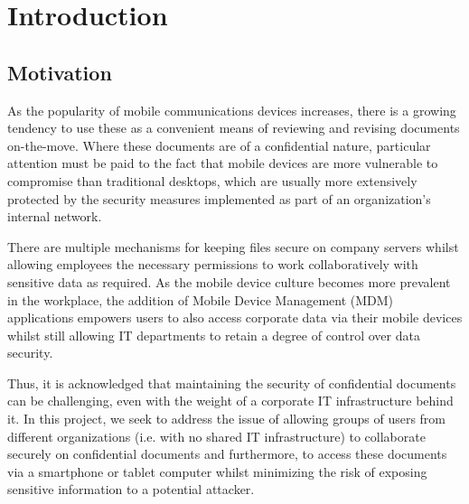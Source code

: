 
\chapter{Introduction}
\label{cha:introduction}
\section{Motivation}
\label{sec:motivation}
As the popularity of mobile communications devices increases, there is a growing tendency to use these as a convenient means of reviewing and revising documents on-the-move. Where these documents are of a confidential nature, particular attention must be paid to the fact that mobile devices are more vulnerable to compromise than traditional desktops, which are usually more extensively protected by the security measures implemented as part of an organization's internal network. 

There are multiple mechanisms for keeping files secure on company servers whilst allowing employees the necessary permissions to work collaboratively with sensitive data as required.  As the mobile device culture becomes more prevalent in the workplace, the addition of Mobile Device Management (MDM) applications empowers users to also access corporate data via their mobile devices whilst still allowing IT departments to retain a degree of control over data security.  

Thus, it is acknowledged that maintaining the security of confidential documents can be challenging, even with the weight of a corporate IT infrastructure behind it.  In this project, we seek to address the issue of allowing groups of users from different organizations (i.e. with no shared IT infrastructure) to collaborate securely on confidential documents and furthermore, to access these documents via a smartphone or tablet computer whilst minimizing the risk of exposing sensitive information to a potential attacker.


